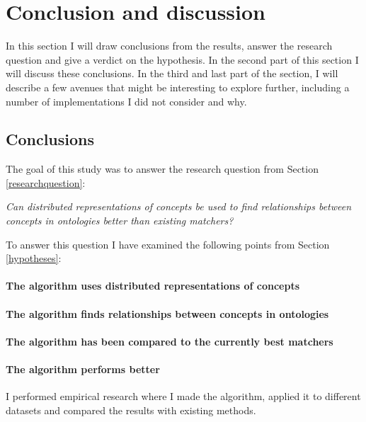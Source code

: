 \documentclass{article}
\begin{document}
 \newpage
 \section{Conclusion and discussion}
 In this section I will draw conclusions from the results, answer the research question and give a verdict on the hypothesis. In the second part of this section I will discuss these conclusions. In the third and last part of the section, I will describe a few avenues that might be interesting to explore further, including a number of implementations I did not consider and why.
 
 \subsection{Conclusions} \label{conclusions}

 
 The goal of this study was to answer the research question from Section \ref{researchquestion}:
 \begin{center}
 \textit{
 Can distributed representations of concepts be used to find relationships between concepts in ontologies better than existing matchers?
 }
 \end{center}
 
 To answer this question I have examined the following points from Section \ref{hypotheses}:
 
\paragraph{The algorithm uses distributed representations of concepts}
\paragraph{The algorithm finds relationships between concepts in ontologies}
\paragraph{The algorithm has been compared to the currently best matchers}
\paragraph{The algorithm performs better}
 I performed empirical research where I made the algorithm, applied it to different datasets and compared the results with existing methods.
 
\end{document}
